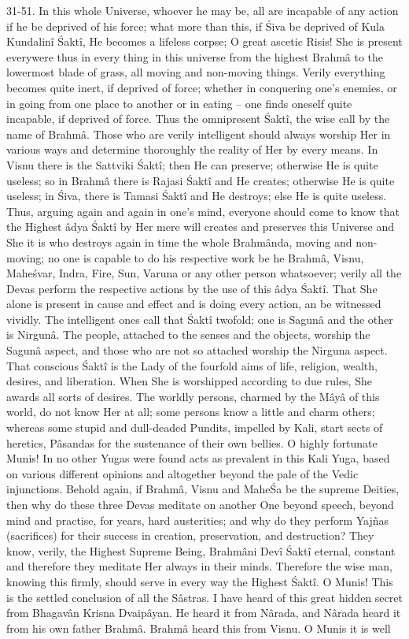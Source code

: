 31-51. In this whole Universe, whoever he may be, all are incapable of any action if he be deprived of his force; what more than this, if \'Siva be deprived of Kula Kundalin\^i \'Sakt\^i, He becomes a lifeless corpse; O great ascetic Risis! She is present everywere thus in every thing in this universe from the highest Brahm\^a to the lowermost blade of grass, all moving and non-moving things. Verily everything becomes quite inert, if deprived of force; whether in conquering one's enemies, or in going from one place to another or in eating -- one finds oneself quite incapable, if deprived of force. Thus the omnipresent \'Sakt\^i, the wise call by the name of Brahm\^a. Those who are verily intelligent should always worship Her in various ways and determine thoroughly the reality of Her by every means. In Visnu there is the Sattviki \'Sakt\^i; then He can preserve; otherwise He is quite useless; so in Brahm\^a there is Rajasi \'Sakt\^i and He creates; otherwise He is quite useless; in \'Siva, there is Tamasi \'Sakt\^i and He destroys; else He is quite useless. Thus, arguing again and again in one's mind, everyone should come to know that the Highest \^adya \'Sakt\^i by Her mere will creates and preserves this Universe and She it is who destroys again in time the whole Brahm\^anda, moving and non-moving; no one is capable to do his respective work be he Brahm\^a, Visnu, Mahe\'svar, Indra, Fire, Sun, Varuna or any other person whatsoever; verily all the Devas perform the respective actions by the use of this \^adya \'Sakt\^i. That She alone is present in cause and effect and is doing every action, an be witnessed vividly. The intelligent ones call that \'Sakt\^i twofold; one is Sagun\^a and the other is Nirgun\^a. The people, attached to the senses and the objects, worship the Sagun\^a aspect, and those who are not so attached worship the Nirguna aspect. That conscious \'Sakt\^i is the Lady of the fourfold aims of life, religion, wealth, desires, and liberation. When She is worshipped according to due rules, She awards all sorts of desires. The worldly persons, charmed by the M\^ay\^a of this world, do not know Her at all; some persons know a little and charm others; whereas some stupid and dull-deaded Pundits, impelled by Kali, start sects of heretics, P\^asandas for the sustenance of their own bellies. O highly fortunate Munis! In no other Yugas were found acts as prevalent in this Kali Yuga, based on various different opinions and altogether beyond the pale of the Vedic injunctions. Behold again, if Brahm\^a, Visnu and Mahe\'Sa be the supreme Deities, then why do these three Devas meditate on another One beyond speech, beyond mind and practise, for years, hard austerities; and why do they perform Yajñas (sacrifices) for their success in creation, preservation, and destruction? They know, verily, the Highest Supreme Being, Brahm\^ani Dev\^i \'Sakt\^i eternal, constant and therefore they meditate Her always in their minds. Therefore the wise man, knowing this firmly, should serve in every way the Highest \'Sakt\^i. O Munis! This is the settled conclusion of all the S\^astras. I have heard of this great hidden secret from Bhagav\^an Krisna Dvaip\^ayan. He heard it from N\^arada, and N\^arada heard it from his own father Brahm\^a. Brahm\^a heard this from Visnu. O Munis it is well 